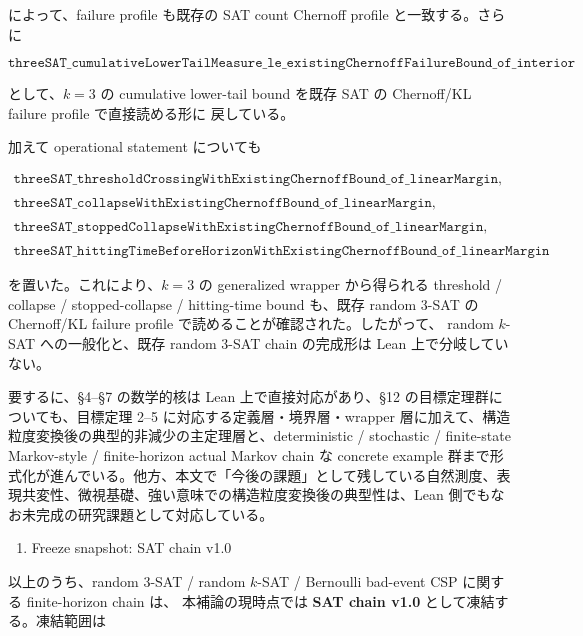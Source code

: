 \documentclass[12pt,a4paper]{article}
\begin{document}
によって、failure profile も既存の SAT count Chernoff profile と一致する。さらに

\[
\texttt{threeSAT\_cumulativeLowerTailMeasure\_le\_existingChernoffFailureBound\_of\_interior}
\]

として、\(k=3\) の cumulative lower-tail bound を既存 SAT の Chernoff/KL failure profile で直接読める形に 戻している。

加えて operational statement についても

\[
\begin{aligned}
\texttt{threeSAT\_thresholdCrossingWithExistingChernoffBound\_of\_linearMargin}, \\
\quad \\
\texttt{threeSAT\_collapseWithExistingChernoffBound\_of\_linearMargin}, \\
\quad \\
\texttt{threeSAT\_stoppedCollapseWithExistingChernoffBound\_of\_linearMargin}, \\
\quad \\
\texttt{threeSAT\_hittingTimeBeforeHorizonWithExistingChernoffBound\_of\_linearMargin}
\end{aligned}
\]

を置いた。これにより、\(k=3\) の generalized wrapper から得られる threshold / collapse / stopped-collapse / hitting-time bound も、既存 random 3-SAT の Chernoff/KL failure profile で読めることが確認された。したがって、 random \(k\)-SAT への一般化と、既存 random 3-SAT chain の完成形は Lean 上で分岐していない。

要するに、§4--§7 の数学的核は Lean 上で直接対応があり、§12 の目標定理群についても、目標定理 2--5 に対応する定義層・境界層・wrapper 層に加えて、構造粒度変換後の典型的非減少の主定理層と、deterministic / stochastic / finite-state Markov-style / finite-horizon actual Markov chain な concrete example 群まで形式化が進んでいる。他方、本文で「今後の課題」として残している自然測度、表現共変性、微視基礎、強い意味での構造粒度変換後の典型性は、Lean 側でもなお未完成の研究課題として対応している。

\begin{enumerate}
\def\labelenumi{\arabic{enumi}.}
\setcounter{enumi}{13}
\tightlist
\item
  Freeze snapshot: SAT chain v1.0
\end{enumerate}

以上のうち、random 3-SAT / random \(k\)-SAT / Bernoulli bad-event CSP に関する finite-horizon chain は、 本補論の現時点では \textbf{SAT chain v1.0} として凍結する。凍結範囲は
\end{document}
